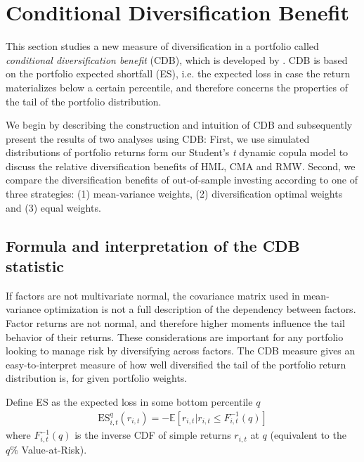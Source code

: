 
\section{Conditional Diversification Benefit} %
\label{sec:conditional_diversification_benefit}

This section studies a new measure of diversification in a portfolio called \emph{conditional diversification benefit} (CDB), which is developed by \textcite{ChristoffersenErrunzaJacobLanglois2012}. CDB is based on the portfolio expected shortfall (ES), i.e. the expected loss in case the return materializes below a certain percentile, and therefore concerns the properties of the tail of the portfolio distribution. 

We begin by describing the construction and intuition of CDB and subsequently present the results of two analyses using CDB: First, we use simulated distributions of portfolio returns form our Student's \textit{t} dynamic copula model to discuss the relative diversification benefits of HML, CMA and RMW. Second, we compare the diversification benefits of out-of-sample investing according to one of three strategies: (1) mean-variance weights, (2) diversification optimal weights and (3) equal weights.

\subsection{Formula and interpretation of the CDB statistic}

If factors are not multivariate normal, the covariance matrix used in mean-variance optimization is not a full description of the dependency between factors. Factor returns are not normal, and therefore higher moments influence the tail behavior of their returns. These considerations are important for any portfolio looking to manage risk by diversifying across factors. The CDB measure gives an easy-to-interpret measure of how well diversified the tail of the portfolio return distribution is, for given portfolio weights.

Define ES as the expected loss in some bottom percentile $q$
\begin{align}
    \text{ES}_{i,t}^q(r_{i,t}) = -\mathbb{E}[r_{i,t} | r_{i,t} \leq F_{i,t}^{-1}(q)]
\end{align}
where $F_{i,t}^{-1}(q)$ is the inverse CDF of simple returns $r_{i,t}$ at $q$ (equivalent to the $q\%$ Value-at-Risk). 

